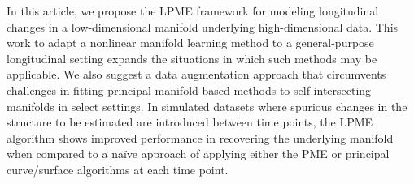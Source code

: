 \documentclass[12pt]{article}
\theoremstyle{definition}
\begin{document}
In this article, we propose the LPME framework for modeling longitudinal changes in a low-dimensional manifold underlying high-dimensional data. This work to adapt a nonlinear manifold learning method to a general-purpose longitudinal setting expands the situations in which such methods may be applicable. We also suggest a data augmentation approach that circumvents challenges in fitting principal manifold-based methods to self-intersecting manifolds in select settings. In simulated datasets where spurious changes in the structure to be estimated are introduced between time points, the LPME algorithm shows improved performance in recovering the underlying manifold when compared to a naïve approach of applying either the PME or principal curve/surface algorithms at each time point. 

\end{document}
